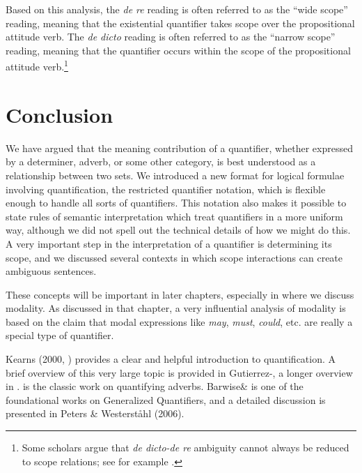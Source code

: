 Based on this analysis, the \textit{de re} reading is often referred to as the “wide scope” reading, meaning that the existential quantifier takes scope over the propositional attitude verb. The \textit{de dicto} reading is often referred to as the “narrow scope” reading, meaning that the quantifier occurs within the scope of the propositional attitude verb.\footnote{Some scholars argue that \textit{de dicto-de re} ambiguity cannot always be reduced to scope relations; see for example \citet{FodorSag1982}.}


\section{Conclusion}\label{sec:} %

We have argued that the meaning contribution of a quantifier, whether expressed by a determiner, adverb, or some other category, is best understood as a relationship between two sets. We introduced a new format for logical formulae involving quantification, the restricted quantifier notation, which is flexible enough to handle all sorts of quantifiers. This notation also makes it possible to state rules of semantic interpretation which treat quantifiers in a more uniform way, although we did not spell out the technical details of how we might do this. A very important step in the interpretation of a quantifier is determining its scope, and we discussed several contexts in which scope interactions can create ambiguous sentences.



These concepts will be important in later chapters, especially in  where we discuss modality. As discussed in that chapter, a very influential analysis of modality is based on the claim that modal expressions like \textit{may}, \textit{must}, \textit{could}, etc. are really a special type of quantifier.



\furtherreading



Kearns (2000, ) provides a clear and helpful introduction to quantification. A brief overview of this very large topic is provided in Gutierrez-\citet{Rexach2013}, a longer overview in \citet{Szabolcsi2015}. \citet{Lewis1975} is the classic work on quantifying adverbs. Barwise\& \citet{Cooper1981} is one of the foundational works on Generalized Quantifiers, and a detailed discussion is presented in Peters \& Westerståhl (2006).


